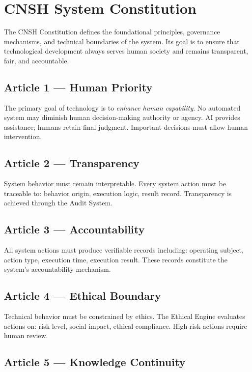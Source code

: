 \documentclass[conference]{IEEEtran}
\begin{document}
\section{CNSH System Constitution}

The CNSH Constitution defines the foundational principles,
governance mechanisms, and technical boundaries of the system.
Its goal is to ensure that technological development always
serves human society and remains transparent, fair, and accountable.

\subsection{Article 1 --- Human Priority}

The primary goal of technology is to \emph{enhance human capability}.
No automated system may diminish human decision-making authority
or agency. AI provides assistance; humans retain final judgment.
Important decisions must allow human intervention.

\subsection{Article 2 --- Transparency}

System behavior must remain interpretable.
Every system action must be traceable to:
behavior origin, execution logic, result record.
Transparency is achieved through the Audit System.

\subsection{Article 3 --- Accountability}

All system actions must produce verifiable records including:
operating subject, action type, execution time, execution result.
These records constitute the system's accountability mechanism.

\subsection{Article 4 --- Ethical Boundary}

Technical behavior must be constrained by ethics.
The Ethical Engine evaluates actions on:
risk level, social impact, ethical compliance.
High-risk actions require human review.

\subsection{Article 5 --- Knowledge Continuity}
\end{document}
